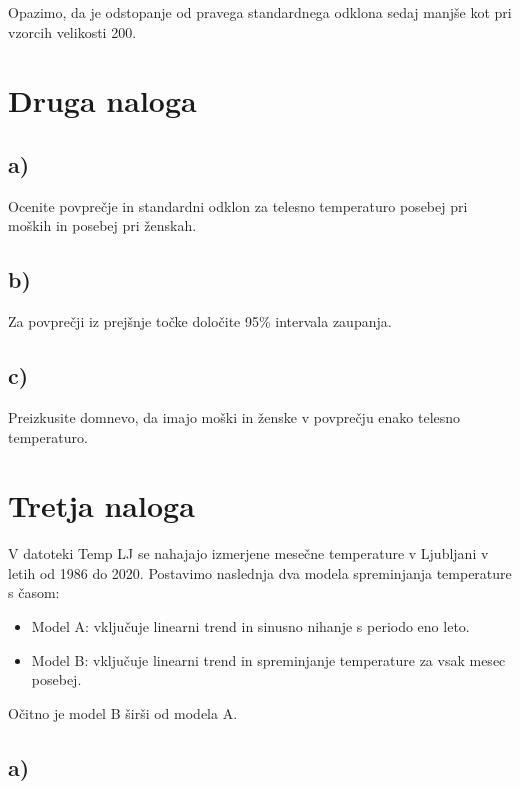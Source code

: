 \documentclass[12pt, a4paper]{article}
\begin{document}

Opazimo, da je odstopanje od pravega standardnega odklona sedaj manjše kot
pri vzorcih velikosti 200.



\section{Druga naloga}

\subsection{a)}
Ocenite povprečje in standardni odklon za telesno temperaturo posebej pri
moških in posebej pri ženskah.

\subsection{b)}
Za povprečji iz prejšnje točke določite 95\% intervala zaupanja.

\subsection{c)}
Preizkusite domnevo, da imajo moški in ženske v povprečju enako telesno 
temperaturo.



\section{Tretja naloga}

V datoteki Temp LJ se nahajajo izmerjene mesečne temperature v Ljubljani v 
letih od 1986 do 2020. Postavimo naslednja dva modela spreminjanja temperature
s časom: 

\begin{itemize}
     
    \item Model A: vključuje linearni trend in sinusno nihanje s periodo eno 
        leto.
    \item Model B: vključuje linearni trend in spreminjanje temperature za 
        vsak mesec posebej.

\end{itemize}

Očitno je model B širši od modela A.

\subsection{a)}
\end{document}
